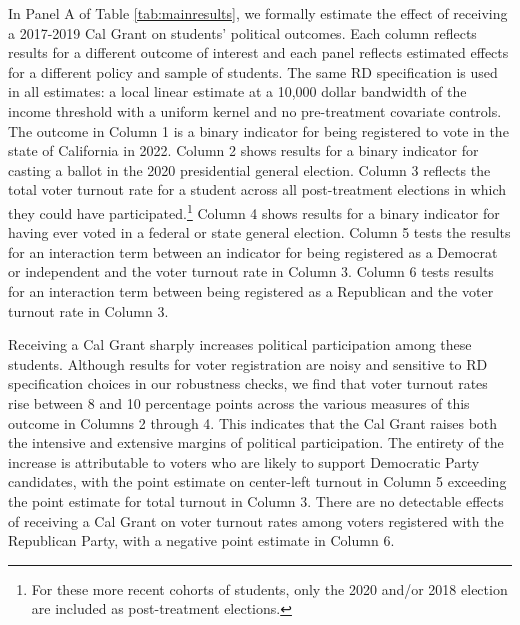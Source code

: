 \documentclass[12pt,letterpaper,oneside]{book}
\begin{document}
In Panel A of Table \ref{tab:mainresults}, we formally estimate the effect of receiving a 2017-2019 Cal Grant on students' political outcomes. Each column reflects results for a different outcome of interest and each panel reflects estimated effects for a different policy and sample of students. The same RD specification is used in all estimates: a local linear estimate at a 10,000 dollar bandwidth of the income threshold with a uniform kernel and no pre-treatment covariate controls. The outcome in Column 1 is a binary indicator for being registered to vote in the state of California in 2022. Column 2 shows results for a binary indicator for casting a ballot in the 2020 presidential general election. Column 3 reflects the total voter turnout rate for a student across all post-treatment elections in which they could have participated.\footnote{For these more recent cohorts of students, only the 2020 and/or 2018 election are included as post-treatment elections.} Column 4 shows results for a binary indicator for having ever voted in a federal or state general election. Column 5 tests the results for an interaction term between an indicator for being registered as a Democrat or independent and the voter turnout rate in Column 3. Column 6 tests results for an interaction term between being registered as a Republican and the voter turnout rate in Column 3.

Receiving a Cal Grant sharply increases political participation among these students. Although results for voter registration are noisy and sensitive to RD specification choices in our robustness checks, we find that voter turnout rates rise between 8 and 10 percentage points across the various measures of this outcome in Columns 2 through 4. This indicates that the Cal Grant raises both the intensive and extensive margins of political participation. The entirety of the increase is attributable to voters who are likely to support Democratic Party candidates, with the point estimate on center-left turnout in Column 5 exceeding the point estimate for total turnout in Column 3. There are no detectable effects of receiving a Cal Grant on voter turnout rates among voters registered with the Republican Party, with a negative point estimate in Column 6.
\end{document}
